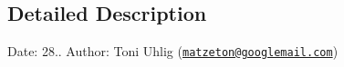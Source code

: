 \subsection{Detailed Description}
Date\+: 28.. Author\+: Toni Uhlig (\href{mailto:matzeton@googlemail.com}{\tt matzeton@googlemail.\+com}) 